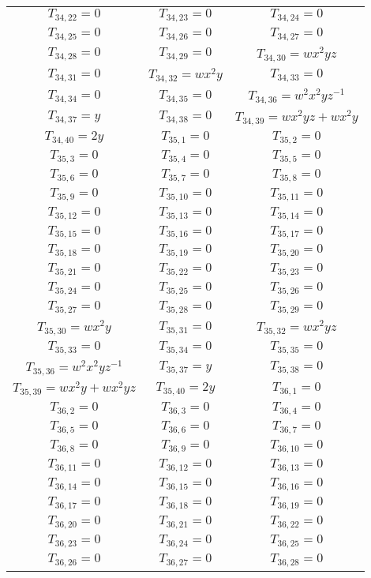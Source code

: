 \documentclass[12pt]{memoireuqam1.3}
\begin{document}
\begin{longtable}{|c|c|c|}
$T_{34,22}= 0$&
$T_{34,23}= 0$&
$T_{34,24}= 0$\\
$T_{34,25}= 0$&
$T_{34,26}= 0$&
$T_{34,27}= 0$\\
$T_{34,28}= 0$&
$T_{34,29}= 0$&
$T_{34,30}= wx^2yz$\\
$T_{34,31}= 0$&
$T_{34,32}= wx^2y$&
$T_{34,33}= 0$\\
$T_{34,34}= 0$&
$T_{34,35}= 0$&
$T_{34,36}= w^2x^2yz^{-1}$\\
$T_{34,37}= y$&
$T_{34,38}= 0$&
$T_{34,39}= wx^2yz+wx^2y$\\
$T_{34,40}= 2y$&
$T_{35,1}= 0$&
$T_{35,2}= 0$\\
$T_{35,3}= 0$&
$T_{35,4}= 0$&
$T_{35,5}= 0$\\
$T_{35,6}= 0$&
$T_{35,7}= 0$&
$T_{35,8}= 0$\\
$T_{35,9}= 0$&
$T_{35,10}= 0$&
$T_{35,11}= 0$\\
$T_{35,12}= 0$&
$T_{35,13}= 0$&
$T_{35,14}= 0$\\
$T_{35,15}= 0$&
$T_{35,16}= 0$&
$T_{35,17}= 0$\\
$T_{35,18}= 0$&
$T_{35,19}= 0$&
$T_{35,20}= 0$\\
$T_{35,21}= 0$&
$T_{35,22}= 0$&
$T_{35,23}= 0$\\
$T_{35,24}= 0$&
$T_{35,25}= 0$&
$T_{35,26}= 0$\\
$T_{35,27}= 0$&
$T_{35,28}= 0$&
$T_{35,29}= 0$\\
$T_{35,30}= wx^2y$&
$T_{35,31}= 0$&
$T_{35,32}= wx^2yz$\\
$T_{35,33}= 0$&
$T_{35,34}= 0$&
$T_{35,35}= 0$\\
$T_{35,36}= w^2x^2yz^{-1}$&
$T_{35,37}= y$&
$T_{35,38}= 0$\\
$T_{35,39}= wx^2y+wx^2yz$&
$T_{35,40}= 2y$&
$T_{36,1}= 0$\\
$T_{36,2}= 0$&
$T_{36,3}= 0$&
$T_{36,4}= 0$\\
$T_{36,5}= 0$&
$T_{36,6}= 0$&
$T_{36,7}= 0$\\
$T_{36,8}= 0$&
$T_{36,9}= 0$&
$T_{36,10}= 0$\\
$T_{36,11}= 0$&
$T_{36,12}= 0$&
$T_{36,13}= 0$\\
$T_{36,14}= 0$&
$T_{36,15}= 0$&
$T_{36,16}= 0$\\
$T_{36,17}= 0$&
$T_{36,18}= 0$&
$T_{36,19}= 0$\\
$T_{36,20}= 0$&
$T_{36,21}= 0$&
$T_{36,22}= 0$\\
$T_{36,23}= 0$&
$T_{36,24}= 0$&
$T_{36,25}= 0$\\
$T_{36,26}= 0$&
$T_{36,27}= 0$&
$T_{36,28}= 0$\\

\end{longtable}
\end{document}
